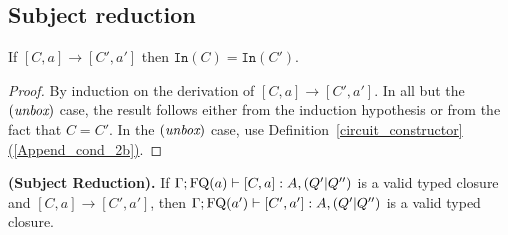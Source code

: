 \documentclass[twoside]{article}
\begin{document}
\subsection{Subject reduction}

\begin{lemma}
\label{Inwires}
If $[C,a]\to[C',a']$ then $\mathtt{In}(C)=\mathtt{In}(C')$.
\end{lemma}

\begin{proof}
By induction on the derivation of $[C,a]\to[C',a']$. 
In all but the $(\mathop{\textit{unbox}}\nolimits)$ case, the result follows either from the induction 
hypothesis or from the fact that $C=C'$. In the $(\mathop{\textit{unbox}}\nolimits)$ case, use 
Definition~\hyperref[Append_cond_2b]{\ref*{circuit_constructor}(\ref*{Append_cond_2b})}.
\end{proof}

\begin{theorem}
{\bf (Subject Reduction).}
\label{thm-subject-red}
If $\Gamma;\mathop{\textrm{FQ}}\nolimits(a)\vdash [C,a]:A,(Q'|Q'')$ is a valid typed closure 
and $[C,a]\to [C',a']$, then $\Gamma;\mathop{\textrm{FQ}}\nolimits(a')\vdash [C',a']:A,(Q'|Q'')$ is 
a valid typed closure.
\end{theorem}
\end{document}
